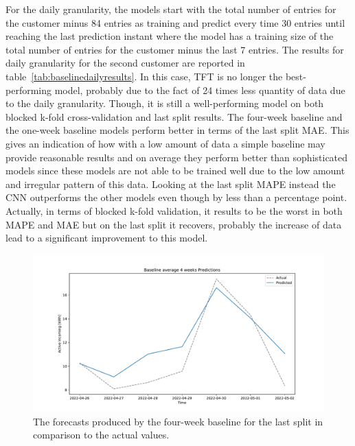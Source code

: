 For the daily granularity, the models start with the total number of entries for the customer minus 84 entries as training and predict every time 30 entries until reaching the last prediction instant where the model has a training size of the total number of entries for the customer minus the last 7 entries.
The results for daily granularity for the second customer are reported in table~\ref{tab:baselinedailyresults}.
In this case, TFT is no longer the best-performing model, probably due to the fact of 24 times less quantity of data due to the daily granularity.
Though, it is still a well-performing model on both blocked k-fold cross-validation and last split results.
The four-week baseline and the one-week baseline models perform better in terms of the last split MAE.
This gives an indication of how with a low amount of data a simple baseline may provide reasonable results and on average they perform better than sophisticated models since these models are not able to be trained well due to the low amount and irregular pattern of this data.
Looking at the last split MAPE instead the CNN outperforms the other models even though by less than a percentage point.
Actually, in terms of blocked k-fold validation, it results to be the worst in both MAPE and MAE but on the last split it recovers, probably the increase of data lead to a significant improvement to this model.

\begin{figure}[H]
\centering
\includegraphics[width=1\textwidth]{images/baseline/baseline_average_4_weeks_daily_aggregated}
\caption{The forecasts produced by the four-week baseline for the last split in comparison to the actual values.}
\label{fig:baseline4weeksdailyforecasts}
\end{figure}

